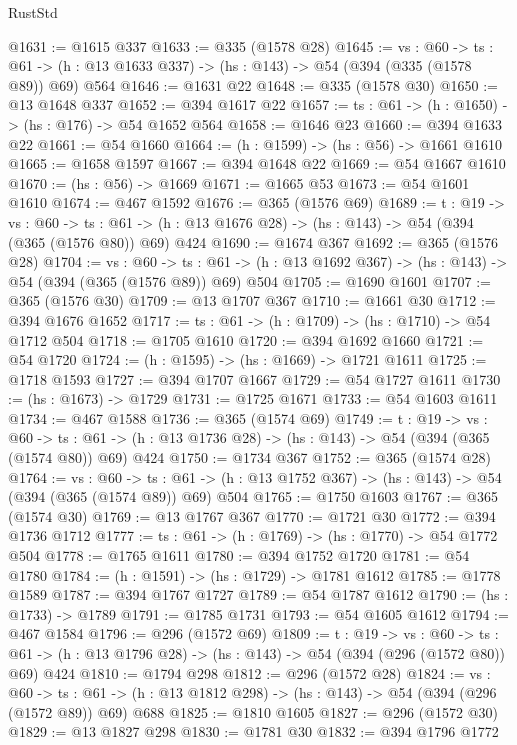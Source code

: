 \begin{lexlean}{RustStd}
\begin{coremodule}
{\begin{coremodule}
{{{{{{{{{{@1631 := @1615 @337
@1633 := @335 (@1578 @28)
@1645 := {vs : @60} ->
  {ts : @61} -> (h : @13 @1633 @337) -> (hs : @143) -> @54 (@394 (@335 (@1578 @89)) @69) @564
@1646 := @1631 @22
@1648 := @335 (@1578 @30)
@1650 := @13 @1648 @337
@1652 := @394 @1617 @22
@1657 := {ts : @61} -> (h : @1650) -> (hs : @176) -> @54 @1652 @564
@1658 := @1646 @23
@1660 := @394 @1633 @22
@1661 := @54 @1660
@1664 := (h : @1599) -> (hs : @56) -> @1661 @1610
@1665 := @1658 @1597
@1667 := @394 @1648 @22
@1669 := @54 @1667 @1610
@1670 := (hs : @56) -> @1669
@1671 := @1665 @53
@1673 := @54 @1601 @1610
@1674 := @467 @1592
@1676 := @365 (@1576 @69)
@1689 := {t : @19} ->
  {vs : @60} ->
  {ts : @61} -> (h : @13 @1676 @28) -> (hs : @143) -> @54 (@394 (@365 (@1576 @80)) @69) @424
@1690 := @1674 @367
@1692 := @365 (@1576 @28)
@1704 := {vs : @60} ->
  {ts : @61} -> (h : @13 @1692 @367) -> (hs : @143) -> @54 (@394 (@365 (@1576 @89)) @69) @504
@1705 := @1690 @1601
@1707 := @365 (@1576 @30)
@1709 := @13 @1707 @367
@1710 := @1661 @30
@1712 := @394 @1676 @1652
@1717 := {ts : @61} -> (h : @1709) -> (hs : @1710) -> @54 @1712 @504
@1718 := @1705 @1610
@1720 := @394 @1692 @1660
@1721 := @54 @1720
@1724 := (h : @1595) -> (hs : @1669) -> @1721 @1611
@1725 := @1718 @1593
@1727 := @394 @1707 @1667
@1729 := @54 @1727 @1611
@1730 := (hs : @1673) -> @1729
@1731 := @1725 @1671
@1733 := @54 @1603 @1611
@1734 := @467 @1588
@1736 := @365 (@1574 @69)
@1749 := {t : @19} ->
  {vs : @60} ->
  {ts : @61} -> (h : @13 @1736 @28) -> (hs : @143) -> @54 (@394 (@365 (@1574 @80)) @69) @424
@1750 := @1734 @367
@1752 := @365 (@1574 @28)
@1764 := {vs : @60} ->
  {ts : @61} -> (h : @13 @1752 @367) -> (hs : @143) -> @54 (@394 (@365 (@1574 @89)) @69) @504
@1765 := @1750 @1603
@1767 := @365 (@1574 @30)
@1769 := @13 @1767 @367
@1770 := @1721 @30
@1772 := @394 @1736 @1712
@1777 := {ts : @61} -> (h : @1769) -> (hs : @1770) -> @54 @1772 @504
@1778 := @1765 @1611
@1780 := @394 @1752 @1720
@1781 := @54 @1780
@1784 := (h : @1591) -> (hs : @1729) -> @1781 @1612
@1785 := @1778 @1589
@1787 := @394 @1767 @1727
@1789 := @54 @1787 @1612
@1790 := (hs : @1733) -> @1789
@1791 := @1785 @1731
@1793 := @54 @1605 @1612
@1794 := @467 @1584
@1796 := @296 (@1572 @69)
@1809 := {t : @19} ->
  {vs : @60} ->
  {ts : @61} -> (h : @13 @1796 @28) -> (hs : @143) -> @54 (@394 (@296 (@1572 @80)) @69) @424
@1810 := @1794 @298
@1812 := @296 (@1572 @28)
@1824 := {vs : @60} ->
  {ts : @61} -> (h : @13 @1812 @298) -> (hs : @143) -> @54 (@394 (@296 (@1572 @89)) @69) @688
@1825 := @1810 @1605
@1827 := @296 (@1572 @30)
@1829 := @13 @1827 @298
@1830 := @1781 @30
@1832 := @394 @1796 @1772
}}}}}}}}}}
\end{coremodule}}
\end{coremodule}
\end{lexlean}
